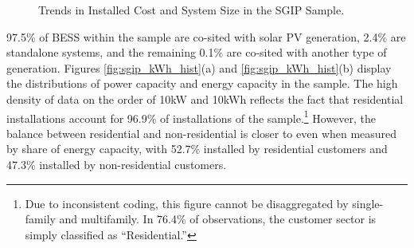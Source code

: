 \documentclass[preprint,12pt,authoryear]{elsarticle}
\begin{document}
\begin{figure}[t!]
\centering
\caption{Trends in Installed Cost and System Size in the SGIP Sample.}\label{fig:SGIP_kWh_trends}
\end{figure}

97.5\% of BESS within the sample are co-sited with solar PV generation, 2.4\% are standalone systems, and the remaining 0.1\% are co-sited with another type of generation. Figures \ref{fig:sgip_kWh_hist}(a) and \ref{fig:sgip_kWh_hist}(b) display the distributions of power capacity and energy capacity in the sample. The high density of data on the order of 10kW and 10kWh reflects the fact that residential installations account for 96.9\% of installations of the sample.\footnote{Due to inconsistent coding, this figure cannot be disaggregated by single-family and multifamily. In 76.4\% of observations, the customer sector is simply classified as ``Residential.''} However, the balance between residential and non-residential is closer to even when measured by share of energy capacity, with 52.7\% installed by residential customers and 47.3\% installed by non-residential customers. 

\end{document}
